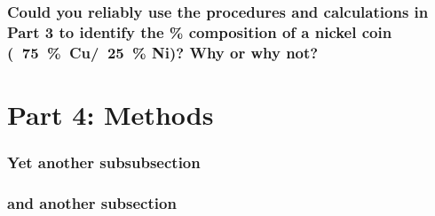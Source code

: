 \documentclass[a4paper,10pt]{article}
\begin{document}
        \subsubsection{Could you reliably use the procedures and calculations in Part 3 to identify the \% composition of a nickel coin (~75~\%~Cu/~25~\% Ni)? Why or why not?}

    \section{Part 4: Methods}
        \subsubsection{Yet another subsubsection}
        \subsubsection{and another subsection}
\end{document}
